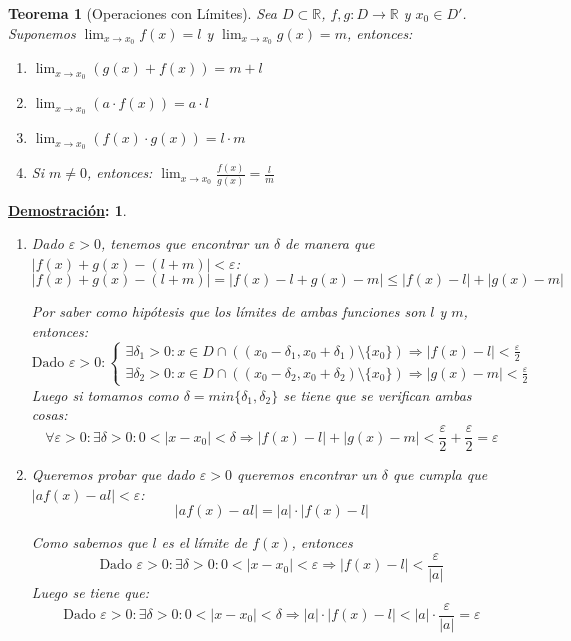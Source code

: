 \documentclass[10pt,a4paper,openright]{book}
\theoremstyle{break}
\newtheorem*{theo}{Teorema}
\newtheorem*{demo}{\underline{Demostración}:}
\begin{document}
\begin{theo}[Operaciones con Límites]
Sea $D\subset \mathbb R$, $f,g: D\longrightarrow \mathbb R$ y $x_0\in D'$. Suponemos $\lim_{x\rightarrow x_0}f(x)=l$ y $\lim_{x\rightarrow x_0}g(x)=m$, entonces:
\begin{enumerate}
\item $\lim_{x\rightarrow x_0}(g(x)+f(x))=m+l$
\item $\lim_{x\rightarrow x_0}(a\cdot f(x))=a\cdot l$
\item $\lim_{x\rightarrow x_0}(f(x)\cdot g(x))=l\cdot m$
\item Si $m\neq 0$, entonces: $\lim_{x\rightarrow x_0}\frac{f(x)}{g(x)}=\frac{l}{m}$
\end{enumerate}
\end{theo}
\begin{demo}
\begin{enumerate}
\item Dado $\varepsilon>0$, tenemos que encontrar un $\delta$ de manera que $|f(x)+g(x)-(l+m)|<\varepsilon$:
$$|f(x)+g(x)-(l+m)|=|f(x)-l+g(x)-m|\leq |f(x)-l|+|g(x)-m|$$

Por saber como hipótesis que los límites de ambas funciones son $l$ y $m$, entonces:
$$\mbox{Dado }\varepsilon>0:\begin{cases} \exists \delta_1>0: x\in D\cap \left((x_0-\delta_1, x_0+\delta_1)\mbox{\textbackslash}\{x_0\}\right)\Rightarrow |f(x)-l|<\frac{\varepsilon}{2}\\ \exists \delta_2>0: x\in D\cap \left((x_0-\delta_2, x_0+\delta_2)\mbox{\textbackslash}\{x_0\}\right)\Rightarrow |g(x)-m|<\frac{\varepsilon}{2}\end{cases}$$
Luego si tomamos como $\delta=min\{\delta_1,\delta_2\}$ se tiene que se verifican ambas cosas:
$$\forall \varepsilon>0: \exists \delta>0: 0<|x-x_0|<\delta\Rightarrow |f(x)-l|+|g(x)-m|<\frac{\varepsilon}{2}+\frac{\varepsilon}{2}=\varepsilon$$

\item Queremos probar que dado $\varepsilon>0$ queremos encontrar un $\delta$ que cumpla que $|af(x)-al|<\varepsilon$:
$$|af(x)-al|=|a|\cdot |f(x)-l|$$

Como sabemos que $l$ es el límite de $f(x)$, entonces
$$\mbox{Dado }\varepsilon>0: \exists \delta>0: 0<|x-x_0|<\varepsilon\Rightarrow |f(x)-l|<\frac{\varepsilon}{|a|}$$
Luego se tiene que:
$$\mbox{Dado }\varepsilon>0: \exists \delta>0: 0<|x-x_0|<\delta\Rightarrow |a|\cdot |f(x)-l|< |a|\cdot \frac{\varepsilon}{|a|}=\varepsilon$$


\end{enumerate}
\end{demo}
\end{document}
